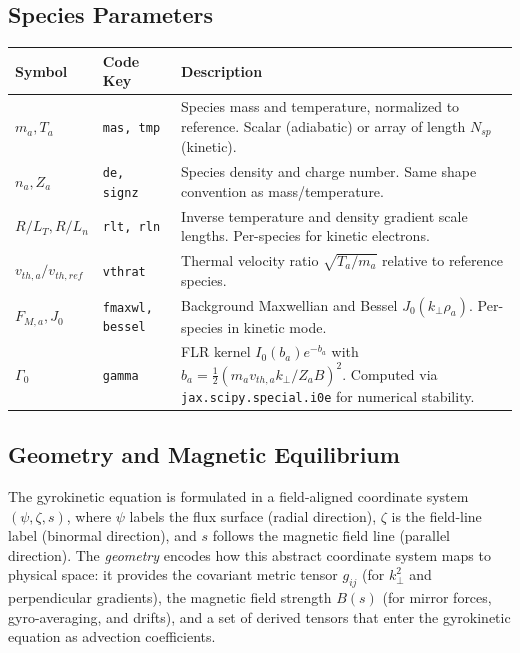 \documentclass{article}
\theoremstyle{plain}
\theoremstyle{definition}
\theoremstyle{remark}
\begin{document}
\subsection{Species Parameters}

\begin{longtable}{p{} p{} p{}}
\toprule
\textbf{Symbol} & \textbf{Code Key} & \textbf{Description} \\
\midrule
\endfirsthead
\midrule
\endhead
\bottomrule
\endfoot
$m_a, T_a$ & \texttt{mas, tmp} & Species mass and temperature, normalized to reference. Scalar (adiabatic) or array of length $N_{sp}$ (kinetic). \\
$n_a, Z_a$ & \texttt{de, signz} & Species density and charge number. Same shape convention as mass/temperature. \\
$R/L_T, R/L_n$ & \texttt{rlt, rln} & Inverse temperature and density gradient scale lengths. Per-species for kinetic electrons. \\
$v_{th,a}/v_{th,ref}$ & \texttt{vthrat} & Thermal velocity ratio $\sqrt{T_a/m_a}$ relative to reference species. \\
$F_{M,a}, J_0$ & \texttt{fmaxwl, bessel} & Background Maxwellian and Bessel $J_0(k_\perp \rho_a)$. Per-species in kinetic mode. \\
$\Gamma_0$ & \texttt{gamma} & FLR kernel $I_0(b_a) e^{-b_a}$ with $b_a = \tfrac{1}{2}(m_a v_{th,a} k_\perp / Z_a B)^2$. Computed via \texttt{jax.scipy.special.i0e} for numerical stability. \\
\bottomrule
\end{longtable}

\subsection{Geometry and Magnetic Equilibrium}
\label{app:geometry}

The gyrokinetic equation is formulated in a field-aligned coordinate system $(\psi, \zeta, s)$, where $\psi$ labels the flux surface (radial direction), $\zeta$ is the field-line label (binormal direction), and $s$ follows the magnetic field line (parallel direction). The \textit{geometry} encodes how this abstract coordinate system maps to physical space: it provides the covariant metric tensor $g_{ij}$ (for $k_\perp^2$ and perpendicular gradients), the magnetic field strength $B(s)$ (for mirror forces, gyro-averaging, and drifts), and a set of derived tensors that enter the gyrokinetic equation as advection coefficients.
\end{document}
